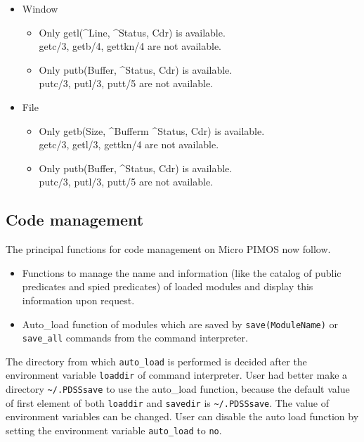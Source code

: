 \begin{itemize}
\item Window
\begin{itemize}

\item[Input]  Only getl(^Line, ^Status, Cdr) is available.\\
getc/3, getb/4, gettkn/4 are not available.

\item[Output] Only putb(Buffer, ^Status, Cdr) is available.\\
putc/3, putl/3, putt/5 are not available.
\end{itemize}
\item File
\begin{itemize}

\item[Input]  Only getb(Size, ^Bufferm ^Status, Cdr) is available.\\
getc/3, getl/3, gettkn/4 are not available.

\item[Output] Only putb(Buffer, ^Status, Cdr) is available.\\
putc/3, putl/3, putt/5 are not available.
\end{itemize}
\end{itemize}

\subsection{Code management}
\label{sec-MPIMOS-code}

The principal functions for code management on Micro PIMOS now follow.

\begin{itemize}
\item Functions to manage the name and information (like the catalog of
public predicates and spied predicates) of loaded modules and display this
information upon request.
\item Auto_load function of modules which are saved by \verb|save(ModuleName)|
or \verb|save_all| commands from the command interpreter.
\end{itemize}

The directory from which \verb|auto_load| is performed
is decided after the environment variable \verb|loaddir|
of command interpreter. User had better make a directory 
\verb|~/.PDSSsave| to use the auto_load function,
because the default value of first element of both
\verb|loaddir| and \verb|savedir| is \verb|~/.PDSSsave|. The value of
environment variables can be changed. User can disable the auto load
function by setting the environment variable \verb|auto_load| to \verb|no|.

